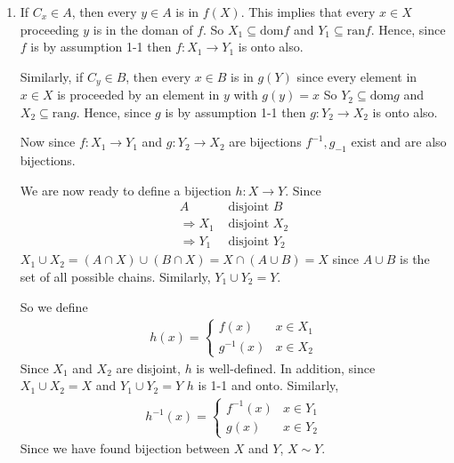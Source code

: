\begin{enumerate}[label=(\alph*)]
    \item 
    If $C_x \in  A$, then every $y\in A$ is in $f(X)$. This implies that every $x\in X$
    proceeding $y$ is in the doman of $f$.
    So $X_1 \subseteq \text{dom} f$ and $Y_1 \subseteq \text{ran} f$. Hence, since $f$ is
    by assumption 1-1 then $f: X_1 \rightarrow Y_1$ is onto also.

    Similarly, if $C_y \in  B$, then every $x\in B$ is in $g(Y)$ since every element in $x\in X$
    is proceeded by an element in $y$ with $g(y)=x$
    So $Y_2 \subseteq \text{dom} g$ and $X_2 \subseteq \text{ran} g$. Hence, since $g$ is
    by assumption 1-1 then $g: Y_2 \rightarrow X_2$ is onto also.

    Now since $f:X_1 \rightarrow Y_1$ and $g: Y_2 \rightarrow X_2$ are bijections $f^{-1}, g_{-1}$
    exist and are also bijections. 
    
    We are now ready to define a bijection $h: X \rightarrow Y$. Since
    \begin{align*}
        A &\text{ disjoint } B \\
       \Rightarrow X_1 &\text{ disjoint } X_2 \\
       \Rightarrow Y_1 &\text{ disjoint } Y_2
    \end{align*}
    $X_1 \cup X_2 = (A \cap X) \cup (B \cap X) = X \cap (A \cup B) = X$ since $A \cup B$ is the
    set of all possible chains. Similarly, $Y_1 \cup Y_2 = Y$.

    So we define 
    \begin{align*}
        h(x) = 
        \begin{cases}
            f(x) & x \in X_1 \\
            g^{-1}(x) & x \in X_2
        \end{cases}
    \end{align*}
    Since $X_1$ and $X_2$ are disjoint, $h$ is well-defined. In addition, since $X_1 \cup X_2 = X$
    and $Y_1 \cup Y_2 = Y$ $h$ is 1-1 and onto. Similarly,
    \begin{align*}
        h^{-1}(x) = 
        \begin{cases}
            f^{-1}(x) & x \in Y_1 \\
            g(x) & x \in Y_2
        \end{cases}
    \end{align*}
    Since we have found bijection between $X$ and $Y$, $X \sim Y$.

\end{enumerate}
